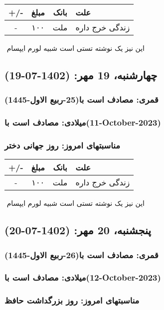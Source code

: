 \documentclass{article}
\newcommand{\rnote}[1]{\marginpar{\textcolor{color}{\StrSubstitute{\##1}{ }{\_}}}}
\newcommand{\myRow}[4]{
    #1 & #2 & #3 & #4 \\ \hline
}
\begin{document}
\begin{tabular}{ | c | c | c | p{5cm} |}
    \hline
    \myRow{ +/- }{مبلغ}{بانک}{علت}
    \myRow{-}{۱۰۰}{ملت}{زندگی خرج داره}
\end{tabular}
\newline
\newline

‌
\rnote{تست}
این نیز یک نوشته تستی است شبیه لورم ایپسام




\newpage
{}
\textcolor{color}{
\section{ چهارشنبه، 19 مهر: (1402-07-19) }
\subsubsection*{قمری: مصادف است با(25-ربیع الاول-1445)} 
\subsubsection*{میلادی: مصادف است با(11-October-2023)}
\subsubsection*{مناسبتهای امروز: روز جهانی دختر}
}


\begin{tabular}{ | c | c | c | p{5cm} |}
    \hline
    \myRow{ +/- }{مبلغ}{بانک}{علت}
    \myRow{-}{۱۰۰}{ملت}{زندگی خرج داره}
\end{tabular}
\newline
\newline

‌
\rnote{تست}
این نیز یک نوشته تستی است شبیه لورم ایپسام




\newpage
{}
\textcolor{color}{
\section{ پنجشنبه، 20 مهر: (1402-07-20) }
\subsubsection*{قمری: مصادف است با(26-ربیع الاول-1445)} 
\subsubsection*{میلادی: مصادف است با(12-October-2023)}
\subsubsection*{مناسبتهای امروز: روز بزرگداشت حافظ}
}
\end{document}
